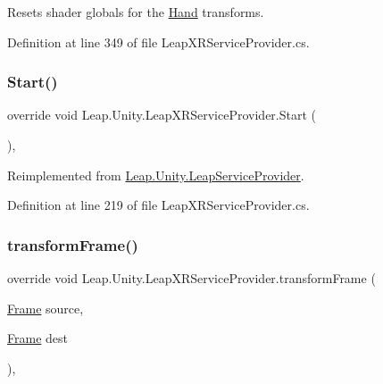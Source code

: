 Resets shader globals for the \mbox{\hyperlink{class_leap_1_1_hand}{Hand}} transforms. 



Definition at line 349 of file Leap\+X\+R\+Service\+Provider.\+cs.

\mbox{\label{class_leap_1_1_unity_1_1_leap_x_r_service_provider_a0ff2b5db35ce36adb3ede2f63722a34e}} 
\subsubsection{\texorpdfstring{Start()}{Start()}}
{\footnotesize\ttfamily override void Leap.\+Unity.\+Leap\+X\+R\+Service\+Provider.\+Start (\begin{DoxyParamCaption}{ }\end{DoxyParamCaption})\hspace{0.3cm}{\ttfamily [protected]}, {\ttfamily [virtual]}}



Reimplemented from \mbox{\hyperlink{class_leap_1_1_unity_1_1_leap_service_provider_aee7af248182bf0df5767cf27f55ec1ca}{Leap.\+Unity.\+Leap\+Service\+Provider}}.



Definition at line 219 of file Leap\+X\+R\+Service\+Provider.\+cs.

\mbox{\label{class_leap_1_1_unity_1_1_leap_x_r_service_provider_a1bac02ff68b78b4e584567c6e4bf42ac}} 
\subsubsection{\texorpdfstring{transformFrame()}{transformFrame()}}
{\footnotesize\ttfamily override void Leap.\+Unity.\+Leap\+X\+R\+Service\+Provider.\+transform\+Frame (\begin{DoxyParamCaption}\item[{\mbox{\hyperlink{class_leap_1_1_frame}{Frame}}}]{source,  }\item[{\mbox{\hyperlink{class_leap_1_1_frame}{Frame}}}]{dest }\end{DoxyParamCaption})\hspace{0.3cm}{\ttfamily [protected]}, {\ttfamily [virtual]}}




